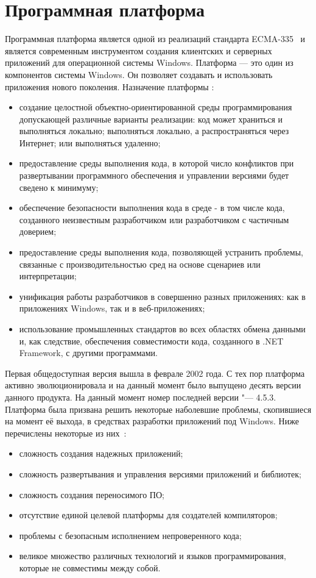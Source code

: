 \section{Программная платформа \dotnet}
\label{sub:practice:microsoft_net}
Программная платформа \dotnet{} является одной из реализаций стандарта ECMA-335~\cite{ecma_335} и является современным инструментом создания клиентских и серверных приложений для операционной системы Windows.
Платформа \dotnet{} --- это один из компонентов системы Windows.
Он позволяет создавать и использовать приложения нового поколения.
Назначение платформы \dotnet{}:
\begin{itemize}
  \item	создание целостной объектно-ориентированной среды программирования допускающей различные варианты реализации: код может храниться и выполняться локально; выполняться локально, а распространяться через Интернет; или выполняться удаленно;
	\item предоставление среды выполнения кода, в которой число конфликтов при развертывании программного обеспечения и управлении версиями будет сведено к минимуму;
  \item обеспечение безопасности выполнения кода в среде - в том числе кода, созданного неизвестным разработчиком или разработчиком с частичным доверием;
  \item предоставление среды выполнения кода, позволяющей устранить проблемы, связанные с производительностью сред на основе сценариев или интерпретации;
  \item унификация работы разработчиков в совершенно разных приложениях: как в приложениях Windows, так и в веб-приложениях;
  \item использование промышленных стандартов во всех областях обмена данными и, как следствие, обеспечения совместимости кода, созданного в .NET Framework, с другими программами.
\end{itemize}

Первая общедоступная версия \netfx{} вышла в феврале 2002 года.
С тех пор платформа активно эволюционировала и на данный момент было выпущено десять версии данного продукта.
На данный момент номер последней версии \netfx{} "--- 4.5.3.
Платформа \dotnet{} была призвана решить некоторые наболевшие проблемы, скопившиеся на момент её выхода, в средствах разработки приложений под Windows.
Ниже перечислены некоторые из них~\cite[с.~\,--\,]{richter_2007_ru}:
\begin{itemize}
  \item сложность создания надежных приложений;
  \item сложность развертывания и управления версиями приложений и библиотек;
  \item сложность создания переносимого ПО;
  \item отсутствие единой целевой платформы для создателей компиляторов;
  \item проблемы с безопасным исполнением непроверенного кода;
  \item великое множество различных технологий и языков программирования, которые не совместимы между собой.
\end{itemize}

